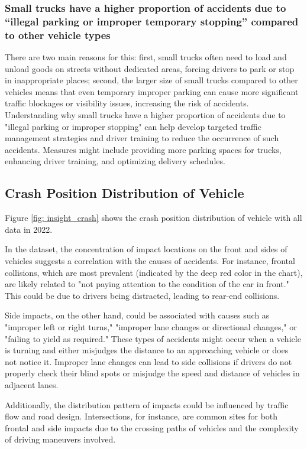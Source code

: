 \documentclass[a4paper, oneside, final, 12pt]{scrartcl} %
\begin{document}
\subsubsection{Small trucks have a higher proportion of accidents due to
“illegal parking or improper temporary stopping” compared to other vehicle types}

There are two main reasons for this: first, 
small trucks often need to load and unload goods on streets without dedicated areas, 
forcing drivers to park or stop in inappropriate places; second, 
the larger size of small trucks compared to other vehicles means that 
even temporary improper parking can cause more significant traffic blockages or 
visibility issues, increasing the risk of accidents. Understanding why 
small trucks have a higher proportion of accidents due to 
"illegal parking or improper stopping" can help develop targeted traffic 
management strategies and driver training to reduce the occurrence of such accidents. 
Measures might include providing more parking spaces for trucks, enhancing driver training,
 and optimizing delivery schedules.

\subsection{Crash Position Distribution of Vehicle}

Figure \ref{fig: insight_crash} shows the crash position distribution of vehicle
with all data in 2022.

In the dataset, the concentration of impact locations on the front and sides 
of vehicles suggests a correlation with the causes of accidents. 
For instance, frontal collisions, which are most prevalent 
(indicated by the deep red color in the chart), are likely related to 
"not paying attention to the condition of the car in front." 
This could be due to drivers being distracted, leading to rear-end collisions.

Side impacts, on the other hand, 
could be associated with causes such as "improper left or right turns," 
"improper lane changes or directional changes," or "failing to yield as required." 
These types of accidents might occur when a vehicle is turning and either 
misjudges the distance to an approaching vehicle or does not notice it. 
Improper lane changes can lead to side collisions if drivers do not properly 
check their blind spots or misjudge the speed and distance of vehicles in adjacent lanes.

Additionally, the distribution pattern of impacts could be influenced 
by traffic flow and road design. Intersections, for instance, 
are common sites for both frontal and side impacts due to the crossing 
paths of vehicles and the complexity of driving maneuvers involved.
\end{document}

